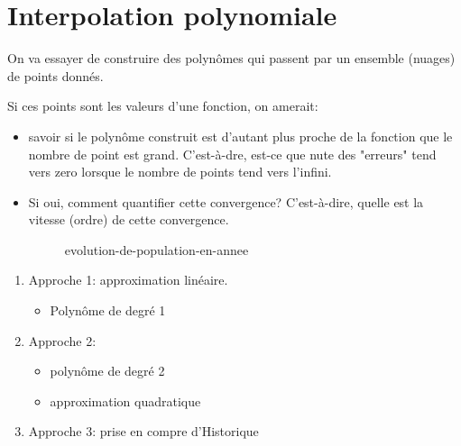 \chapter{Interpolation polynomiale}
On va essayer de construire des polynômes qui passent par un ensemble (nuages) de points donnés.

Si ces points sont les valeurs d'une fonction, on amerait:
\begin{itemize}
    \item savoir si le polynôme construit est d'autant plus proche de la fonction que le nombre de point est grand. C'est-à-dre, est-ce que nute des "erreurs" tend vers zero lorsque le nombre de points tend vers l'infini.
    \item Si oui, comment quantifier cette convergence? C'est-à-dire, quelle est la vitesse (ordre) de cette convergence.
        \begin{figure}[H]
            \centering
            \caption{evolution-de-population-en-annee}
            \label{fig:evolution-de-population-en-annee}
        \end{figure}
\end{itemize}
\begin{enumerate}
    \item Approche 1: approximation linéaire. 
        \begin{itemize}
            \item Polynôme de degré 1
        \end{itemize}
    \item Approche 2: 
        \begin{itemize}
            \item polynôme de degré 2
            \item approximation quadratique
        \end{itemize}
    \item Approche 3: prise en compre d'Historique
\end{enumerate}

